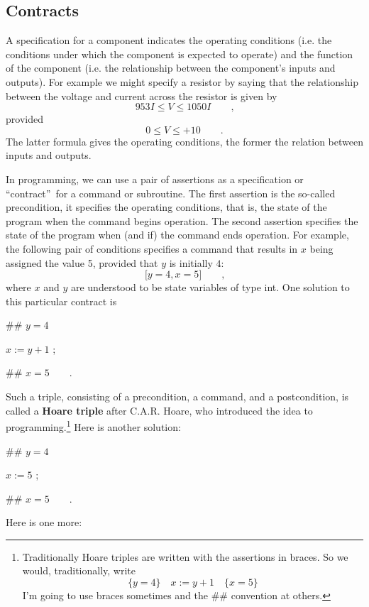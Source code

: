 \documentclass[11pt]{article}%
\begin{document}
\subsection{Contracts}

A specification for a component indicates the operating conditions (i.e. the
conditions under which the component is expected to operate) and the function
of the component (i.e. the relationship between the component's inputs and
outputs). For example we might specify a resistor by saying that the
relationship between the voltage and current across the resistor is given by%
\[
953I\leq V\leq1050I\qquad\text{,}%
\]
provided%
\[
0\leq V\leq+10\qquad\text{.}%
\]
The latter formula gives the operating conditions, the former the relation
between inputs and outputs.

In programming, we can use a pair of assertions as a specification or
\textquotedblleft contract\textquotedblright\ for a command or subroutine. The
first assertion is the so-called precondition, it specifies the operating
conditions, that is, the state of the program when the command begins
operation. The second assertion specifies the state of the program when (and
if) the command ends operation. For example, the following pair of conditions
specifies a command that results in $x$ being assigned the value 5, provided
that $y$ is initially $4$:%
\[
\lbrack y=4,x=5]\qquad\text{,}%
\]
where $x$ and $y$ are understood to be state variables of type \textsf{int}.
One solution to this particular contract is

\begin{code}
\#\# $y=4$

$x:=y+1$ ;

\#\# $x=5\qquad$.
\end{code}

\noindent Such a triple, consisting of a precondition, a command, and a
postcondition, is called a \textbf{Hoare triple} after C.A.R. Hoare, who
introduced the idea to programming.\footnote{Traditionally Hoare triples are
written with the assertions in braces. So we would, traditionally, write
\[
\{y=4\}\quad x:=y+1\quad\{x=5\}
\]
I'm going to use braces sometimes and the \#\# convention at others.} Here is
another solution:

\begin{code}
\#\# $y=4$

$x:=5$ ;

\#\# $x=5\qquad$.
\end{code}

\noindent Here is one more:
\end{document}
